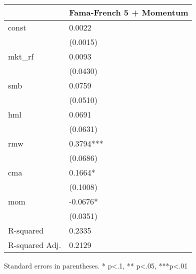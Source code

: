 \begin{table}
\caption{}
\label{}
\begin{center}
\begin{tabular}{ll}
\hline
               & Fama-French 5 + Momentum  \\
\hline
const          & 0.0022                    \\
               & (0.0015)                  \\
mkt\_rf        & 0.0093                    \\
               & (0.0430)                  \\
smb            & 0.0759                    \\
               & (0.0510)                  \\
hml            & 0.0691                    \\
               & (0.0631)                  \\
rmw            & 0.3794***                 \\
               & (0.0686)                  \\
cma            & 0.1664*                   \\
               & (0.1008)                  \\
mom            & -0.0676*                  \\
               & (0.0351)                  \\
R-squared      & 0.2335                    \\
R-squared Adj. & 0.2129                    \\
\hline
\end{tabular}
\end{center}
\end{table}
\bigskip
Standard errors in parentheses. \newline 
* p<.1, ** p<.05, ***p<.01